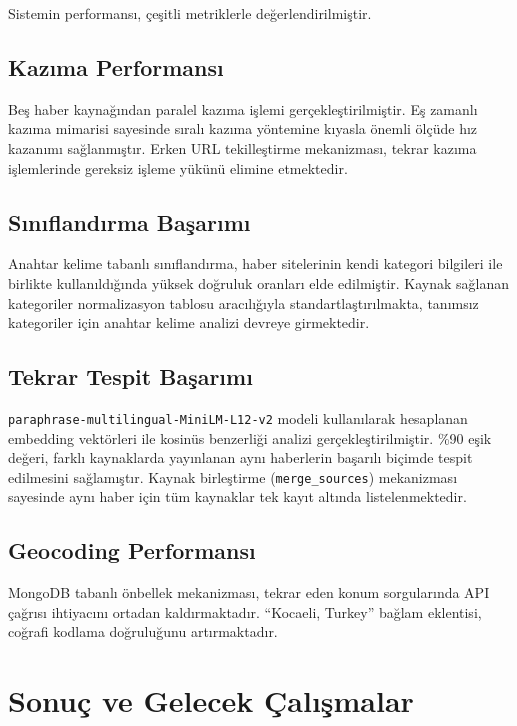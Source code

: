 \documentclass[conference]{IEEEtran}
\begin{document}
Sistemin performansı, çeşitli metriklerle değerlendirilmiştir.

\subsection{Kazıma Performansı}

Beş haber kaynağından paralel kazıma işlemi gerçekleştirilmiştir. Eş zamanlı kazıma mimarisi sayesinde sıralı kazıma yöntemine kıyasla önemli ölçüde hız kazanımı sağlanmıştır. Erken URL tekilleştirme mekanizması, tekrar kazıma işlemlerinde gereksiz işleme yükünü elimine etmektedir.

\subsection{Sınıflandırma Başarımı}

Anahtar kelime tabanlı sınıflandırma, haber sitelerinin kendi kategori bilgileri ile birlikte kullanıldığında yüksek doğruluk oranları elde edilmiştir. Kaynak sağlanan kategoriler normalizasyon tablosu aracılığıyla standartlaştırılmakta, tanımsız kategoriler için anahtar kelime analizi devreye girmektedir.

\subsection{Tekrar Tespit Başarımı}

\texttt{paraphrase-multilingual-MiniLM-L12-v2} modeli kullanılarak hesaplanan embedding vektörleri ile kosinüs benzerliği analizi gerçekleştirilmiştir. \%90 eşik değeri, farklı kaynaklarda yayınlanan aynı haberlerin başarılı biçimde tespit edilmesini sağlamıştır. Kaynak birleştirme (\texttt{merge\_sources}) mekanizması sayesinde aynı haber için tüm kaynaklar tek kayıt altında listelenmektedir.

\subsection{Geocoding Performansı}

MongoDB tabanlı önbellek mekanizması, tekrar eden konum sorgularında API çağrısı ihtiyacını ortadan kaldırmaktadır. ``Kocaeli, Turkey'' bağlam eklentisi, coğrafi kodlama doğruluğunu artırmaktadır.

\section{Sonuç ve Gelecek Çalışmalar}
\label{sec:sonuc}
\end{document}
